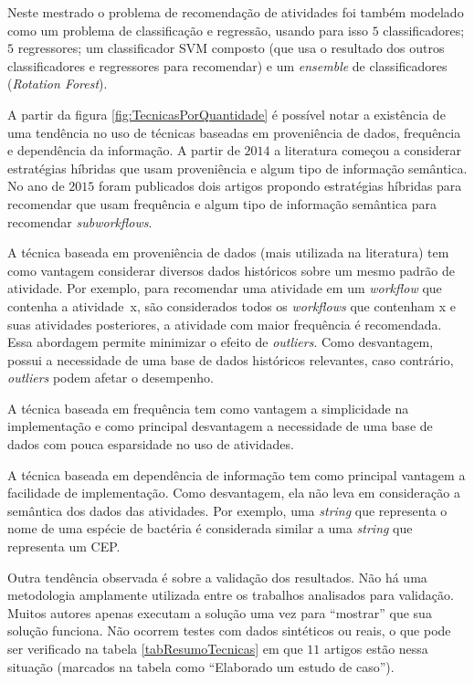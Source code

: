 \documentclass[10pt]{article}
\begin{document}
Neste mestrado o problema de recomendação de atividades foi também modelado como um problema de classificação e regressão, usando para isso \(5\) classificadores; \(5\) regressores; um classificador SVM composto (que usa o resultado dos outros classificadores e regressores para recomendar) e um \emph{ensemble} de classificadores (\emph{Rotation Forest}).

A partir da figura \ref{fig:TecnicasPorQuantidade} é possível notar a existência de uma tendência no uso de técnicas baseadas em proveniência de dados, frequência e dependência da informação. A partir de \(2014\) a literatura começou a considerar estratégias híbridas que usam proveniência e algum tipo de informação semântica. No ano de \(2015\) foram publicados dois artigos propondo estratégias híbridas para recomendar que usam frequência e algum tipo de informação semântica para recomendar \emph{subworkflows}.

A técnica baseada em proveniência de dados (mais utilizada na literatura) tem como vantagem considerar diversos dados históricos sobre um mesmo padrão de atividade. Por exemplo, para recomendar uma atividade em um \emph{workflow} que contenha a atividade~x, são considerados todos os \emph{workflows} que contenham x e suas atividades posteriores, a atividade com maior frequência é recomendada. Essa abordagem permite minimizar o efeito de \emph{outliers}. Como desvantagem, possui a necessidade de uma base de dados históricos relevantes, caso contrário, \emph{outliers} podem afetar o desempenho.

A técnica baseada em frequência tem como vantagem a simplicidade na implementação e como principal desvantagem a necessidade de uma base de dados com pouca esparsidade no uso de atividades.

A técnica baseada em dependência de informação tem como principal vantagem a facilidade de implementação. Como desvantagem, ela não leva em consideração a semântica dos dados das atividades. Por exemplo, uma \emph{string} que representa o nome de uma espécie de bactéria é considerada similar a uma \emph{string} que representa um CEP.

Outra tendência observada é sobre a validação dos resultados. Não há uma metodologia amplamente utilizada entre os trabalhos analisados para validação. Muitos autores apenas executam a solução uma vez para ``mostrar'' que sua solução funciona. Não ocorrem testes com dados sintéticos ou reais, o que pode ser verificado na tabela \ref{tabResumoTecnicas} em que \(11\) artigos estão nessa situação (marcados na tabela como ``Elaborado um estudo de caso'').
\end{document}
